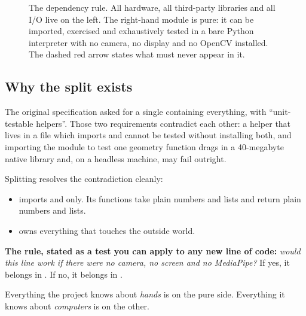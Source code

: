 \begin{figure}[h]
\caption{The dependency rule. All hardware, all third-party libraries and all I/O live on the left.
The right-hand module is pure: it can be imported, exercised and exhaustively tested in a bare Python
interpreter with no camera, no display and no OpenCV installed. The dashed red arrow states what must
never appear in it.}
\label{fig:architecture}
\end{figure}

\subsection{Why the split exists}

The original specification asked for a single  containing everything, with
``unit-testable helpers''. Those two requirements contradict each other: a helper that lives in a
file which imports  and  cannot be tested without installing both, and
importing the module to test one geometry function drags in a 40-megabyte native library and, on a
headless machine, may fail outright.

Splitting resolves the contradiction cleanly:

\begin{itemize}
  \item {} imports  and  only. Its functions take
        plain numbers and lists and return plain numbers and lists.
  \item {} owns everything that touches the outside world.
\end{itemize}

\begin{keyidea}
\textbf{The rule, stated as a test you can apply to any new line of code:} \emph{would this line work
if there were no camera, no screen and no MediaPipe?} If yes, it belongs in . If
no, it belongs in .

Everything the project knows about \emph{hands} is on the pure side. Everything it knows about
\emph{computers} is on the other.
\end{keyidea}

